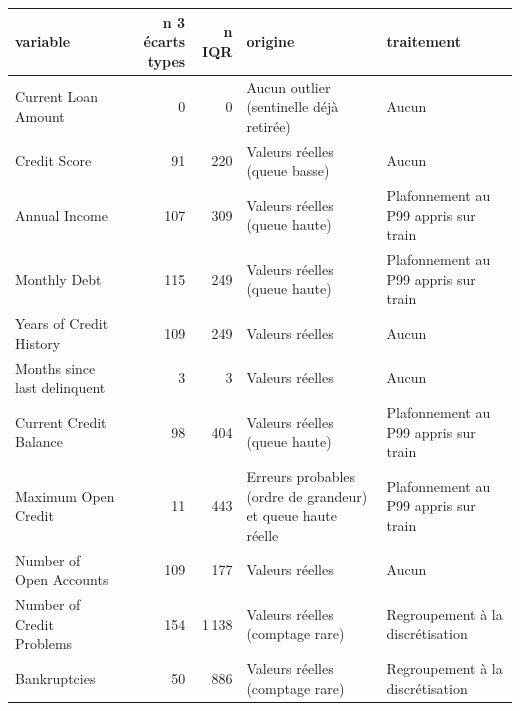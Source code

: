 \begin{tabular}{lrrp{4.2cm}p{3.6cm}}
\toprule
\textbf{variable} & \textbf{n 3 écarts types} & \textbf{n IQR} & \textbf{origine} & \textbf{traitement} \\
\midrule
Current Loan Amount & 0 & 0 & Aucun outlier (sentinelle déjà retirée) & Aucun \\
Credit Score & 91 & 220 & Valeurs réelles (queue basse) & Aucun \\
Annual Income & 107 & 309 & Valeurs réelles (queue haute) & Plafonnement au P99 appris sur train \\
Monthly Debt & 115 & 249 & Valeurs réelles (queue haute) & Plafonnement au P99 appris sur train \\
Years of Credit History & 109 & 249 & Valeurs réelles & Aucun \\
Months since last delinquent & 3 & 3 & Valeurs réelles & Aucun \\
Current Credit Balance & 98 & 404 & Valeurs réelles (queue haute) & Plafonnement au P99 appris sur train \\
Maximum Open Credit & 11 & 443 & Erreurs probables (ordre de grandeur) et queue haute réelle & Plafonnement au P99 appris sur train \\
Number of Open Accounts & 109 & 177 & Valeurs réelles & Aucun \\
Number of Credit Problems & 154 & 1\,138 & Valeurs réelles (comptage rare) & Regroupement à la discrétisation \\
Bankruptcies & 50 & 886 & Valeurs réelles (comptage rare) & Regroupement à la discrétisation \\
\bottomrule
\end{tabular}
